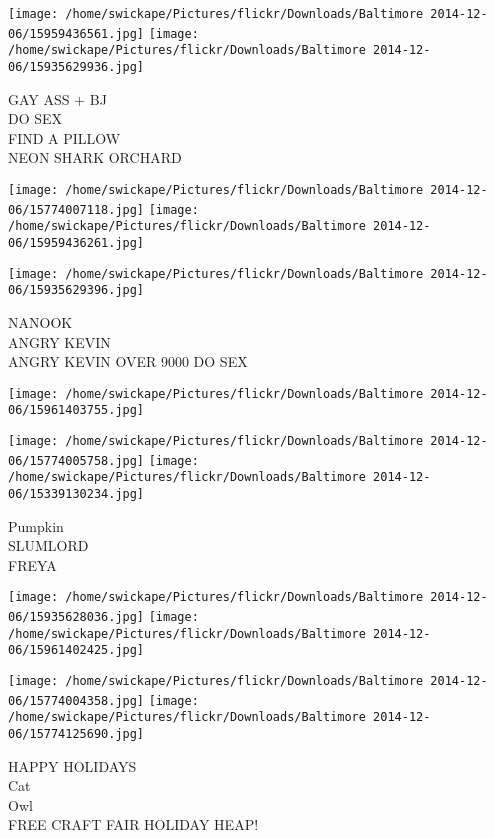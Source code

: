 \documentclass[10pt,letterpaper]{article}
\begin{document}
\texttt{[image: /home/swickape/Pictures/flickr/Downloads/Baltimore 2014-12-06/15959436561.jpg]}
\texttt{[image: /home/swickape/Pictures/flickr/Downloads/Baltimore 2014-12-06/15935629936.jpg]}

GAY ASS + BJ\\
DO SEX\\
FIND A PILLOW\\
NEON SHARK ORCHARD\\
\pagebreak

\texttt{[image: /home/swickape/Pictures/flickr/Downloads/Baltimore 2014-12-06/15774007118.jpg]}
\texttt{[image: /home/swickape/Pictures/flickr/Downloads/Baltimore 2014-12-06/15959436261.jpg]}

\texttt{[image: /home/swickape/Pictures/flickr/Downloads/Baltimore 2014-12-06/15935629396.jpg]}

NANOOK\\
ANGRY KEVIN\\
ANGRY KEVIN OVER 9000 DO SEX\\
\pagebreak

\texttt{[image: /home/swickape/Pictures/flickr/Downloads/Baltimore 2014-12-06/15961403755.jpg]}

\vspace{0.25in}
\texttt{[image: /home/swickape/Pictures/flickr/Downloads/Baltimore 2014-12-06/15774005758.jpg]}
\texttt{[image: /home/swickape/Pictures/flickr/Downloads/Baltimore 2014-12-06/15339130234.jpg]}

Pumpkin\\
SLUMLORD\\
FREYA\\
\pagebreak

\texttt{[image: /home/swickape/Pictures/flickr/Downloads/Baltimore 2014-12-06/15935628036.jpg]}
\texttt{[image: /home/swickape/Pictures/flickr/Downloads/Baltimore 2014-12-06/15961402425.jpg]}

\texttt{[image: /home/swickape/Pictures/flickr/Downloads/Baltimore 2014-12-06/15774004358.jpg]}
\texttt{[image: /home/swickape/Pictures/flickr/Downloads/Baltimore 2014-12-06/15774125690.jpg]}

HAPPY HOLIDAYS\\
Cat\\
Owl\\
FREE CRAFT FAIR HOLIDAY HEAP!\\
\pagebreak
\end{document}
